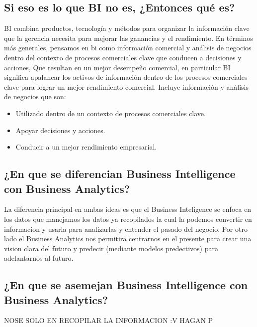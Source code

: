 \documentclass[twoside,twocolumn]{article}
\begin{document}
\subsection{Si eso es lo que BI no es, ¿Entonces qué es?}
BI combina productos, tecnología y métodos para organizar la información clave que la gerencia necesita para mejorar las ganancias y el rendimiento. En términos más generales, pensamos en bi como información comercial y análisis de negocios dentro del contexto de procesos comerciales clave que conducen a decisiones y acciones, Que resultan en un mejor desempeño comercial, en particular BI significa apalancar los activos de información dentro de los procesos comerciales clave para lograr un mejor rendimiento comercial. Incluye información y análisis de negocios que son:
\begin{itemize}	
	\item Utilizado dentro de un contexto de procesos comerciales clave.
	\item Apoyar decisiones y acciones.
	\item Conducir a un mejor rendimiento empresarial.

\end{itemize} 


\subsection{¿En que se diferencian Business Intelligence con Business Analytics?}
La diferencia principal en ambas ideas es que el Business Inteligence se enfoca en los datos que manejamos los datos ya recopilados la cual la podemos convertir en informacion
y usarla para analizarlas y entender el pasado del negocio. Por otro lado el Business Analytics nos permitira centrarnos en el presente para crear una vision clara del futuro y predecir (mediante modelos predectivos) para adelantarnos al futuro.

\subsection{¿En que se asemejan Business Intelligence con Business Analytics?}

NOSE SOLO EN RECOPILAR LA INFORMACION :V HAGAN P



\end{document}
